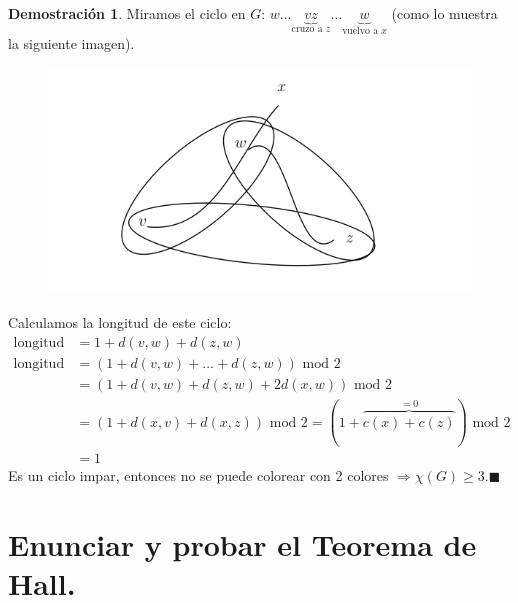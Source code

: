 \documentclass[11pt, a4paper]{article}
\theoremstyle{definition}
\newtheorem*{demostracion}{Demostración}
\begin{document}
\begin{demostracion}
    Miramos el ciclo en $G$: $w \ldots \underset{\text{cruzo a }z}{\underbrace{vz}} \ldots \underset{\text{vuelvo a }x}{\underbrace{w}}$ (como lo muestra la siguiente imagen).

    \begin{figure}[!ht]
        \centering 
        \includegraphics[height=6cm]{Figura 2 2-color.png} 
    \end{figure}
    Calculamos la longitud de este ciclo:
    \begin{align*}
    \text{longitud} &= 1 + d(v, w) + d(z, w) \\
    \text{longitud mod 2} &= (1 + d(v, w) + \ldots + d(z, w)) \text{ mod } 2 \\
    &= (1 + d(v, w) + d(z, w) + 2d(x, w)) \text{ mod } 2 \\
    &= (1 + d(x, v) + d(x, z)) \text{ mod } 2 = (1 + \overbrace{c(x) + c(z)}^{=0}) \text{ mod } 2 \\
    &= 1
    \end{align*}
    Es un ciclo impar, entonces no se puede colorear con 2 colores $\Rightarrow \chi(G)\geq 3. \blacksquare$
\end{demostracion}

\section{Enunciar y probar el Teorema de Hall.}
\end{document}
